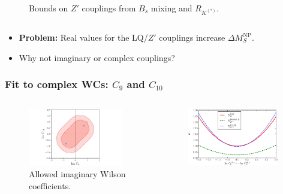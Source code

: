 \documentclass[mathserif, 10pt]{beamer}
\begin{document}
\begin{frame}
\begin{columns}
\begin{column}[t]{0.48\textwidth}
\begin{figure}
\small{Bounds on $Z'$ couplings from $B_s$ mixing and $R_{K^{(*)}}$. \protect\footnotemark[9] }
            \end{figure}
\end{column}
    \end{columns}
    \begin{itemize}
        \item \textbf{Problem:} Real values for the LQ/$Z'$ couplings increase $\Delta M_S^\mathrm{NP}$.
        \item Why not \alert{imaginary or complex} couplings?
    \end{itemize}
\end{frame}

\begin{frame}\frametitle{Fit to complex WCs: $C_9$ and $C_{10}$}
    \begin{columns}
        \begin{column}[t]{0.48\textwidth}
            \begin{figure}
                \centering
                \includegraphics[width=0.95\textwidth]{figures/fitim_C9C10.pdf}\\
                Allowed imaginary Wilson coefficients.
            \end{figure}
        \end{column}
        \begin{column}[t]{0.48\textwidth}
            \begin{figure}
                \centering
                \includegraphics[width=0.95\textwidth]{figures/RK_im.pdf}\\

\end{figure}
\end{column}
\end{columns}
\end{frame}
\end{document}
